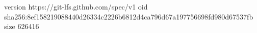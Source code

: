version https://git-lfs.github.com/spec/v1
oid sha256:8ef158219088440d26334c2226b6812d4ca796d67a197756698fd980d67537fb
size 626416

